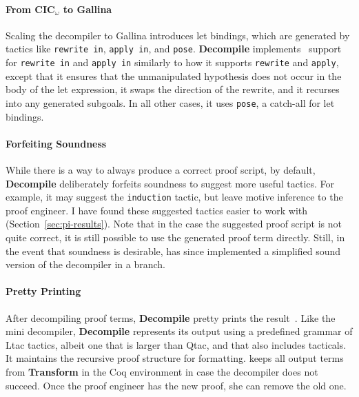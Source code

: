\paragraph{From CIC$_{\omega}$ to Gallina}
Scaling the decompiler to Gallina introduces let bindings, which are generated by 
tactics like \lstinline{rewrite in}, \lstinline{apply in}, and \lstinline{pose}.
\textbf{Decompile} implements~\href{https://github.com/uwplse/coq-plugin-lib/blob/9ef05815c261de9c99b604c6b581ba1c4fbc1a46/src/coq/decompiler/decompiler.ml}{} %
support for \lstinline{rewrite in} and \lstinline{apply in} similarly to how it supports
\lstinline{rewrite} and \lstinline{apply}, except that it ensures that the unmanipulated hypothesis does not occur in the body of the let expression,
it swaps the direction of the rewrite, and it recurses into any generated subgoals.
In all other cases, it uses \lstinline{pose}, a catch-all for let bindings.

\paragraph{Forfeiting Soundness}
While there is a way to always produce a correct proof script,
by default, \textbf{Decompile} deliberately forfeits soundness to suggest more useful tactics.
For example, it may suggest the \lstinline{induction} tactic, but leave motive inference to the proof engineer.
I have found these suggested tactics easier to work with (Section~\ref{sec:pi-results}).
Note that in the case the suggested proof script is not quite correct,
it is still possible to use the generated proof term directly.
Still, in the event that soundness is desirable,  has since implemented a simplified sound
version of the decompiler in a branch. %

\paragraph{Pretty Printing}
After decompiling proof terms, \textbf{Decompile} pretty prints the result~\href{https://github.com/uwplse/coq-plugin-lib/blob/9ef05815c261de9c99b604c6b581ba1c4fbc1a46/src/coq/decompiler/decompiler.ml}{}.
Like the mini decompiler, \textbf{Decompile} represents its output using a predefined grammar of Ltac tactics,
albeit one that is larger than Qtac, and that also includes tacticals.
It maintains the recursive proof structure for formatting. %
\toolnamec keeps all output terms from \textbf{Transform} in the Coq environment in case the decompiler does not succeed.
Once the proof engineer has the new proof, she can remove the old one.

